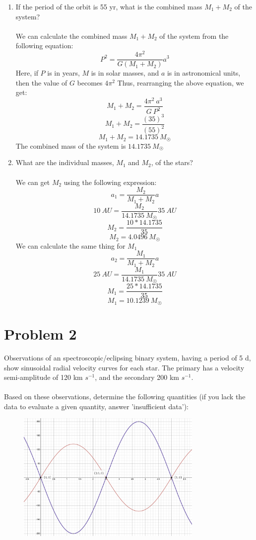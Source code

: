 \documentclass[10pt]{article}
\begin{document}
\begin{enumerate} [label=(\alph*)]
    \item If the period of the orbit is 55 yr, what is the combined mass $M_{1} + M_{2}$ of the system? \\ \\
    We can calculate the combined mass $M_{1} + M_{2}$ of the system from the following equation:
    \[ P^{2} = \frac{4 \pi^{2}}{G (M_{1} + M_{2})} a^{3}\]
    Here, if $P$ is in years, $M$ is in solar masses, and $a$ is in astronomical units, then the value of $G$ becomes $4 \pi^{2}$
    Thus, rearranging the above equation, we get:
    \[ M_{1} + M_{2} = \frac{4 \pi^{2}  \ a^{3}}{G  \ P^{2}}\]
    \[ M_{1} + M_{2} = \frac{(35)^{3}}{(55)^{2}}\]
    \[ M_{1} + M_{2} = 14.1735 \  M_{\astrosun}\]
    The combined mass of the system is $14.1735 \  M_{\astrosun} $

    \item What are the individual masses, $M_{1}$ and $M_{2}$, of the stars? \\ \\
    We can get $M_{2}$ using the following expression:
    \[ a_{1} = \frac{M_{2}}{M_{1} + M_{2}} a\]
    \[ 10 \ AU = \frac{M_{2}}{14.1735 \ M_{\astrosun}} 35 \ AU\]
    \[ M_{2} = \frac{10 * 14.1735}{35}\]
    \[ M_{2} = 4.0496 \ M_{\astrosun}\]
    We can calculate the same thing for $M_{1}$
    \[ a_{2} = \frac{M_{1}}{M_{1} + M_{2}} a\]
    \[ 25 \ AU = \frac{M_{1}}{14.1735 \ M_{\astrosun}} 35 \ AU\]
    \[ M_{1} = \frac{25 * 14.1735}{35}\]
    \[ M_{1} = 10.1239 \ M_{\astrosun}\]
    
\end{enumerate}

\section*{Problem 2}
Observations of an spectroscopic/eclipsing binary system, having a period of 5 d, show sinusoidal radial velocity curves for each star. The primary has a velocity semi-amplitude of 120 km $s^{-1}$, and the secondary 200 km $s^{-1}$. \\ \\
Based on these observations, determine the following quantities (if you lack the data to evaluate a given quantity, answer 'insufficient data'):
\begin{figure}[H]
    \centering
    \includegraphics[width=0.8\textwidth]{hw_9_astron_310_q2.png}
    \label{fig:enter-label}
\end{figure}
\end{document}
